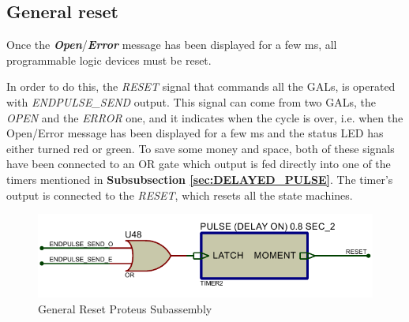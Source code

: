 \subsection{General reset}
\label{sec:GENERAL_RESET}

Once the \textbf{\textit{Open}}/\textbf{\textit{Error}} message has been displayed for a few ms, all programmable logic devices must be reset.
\medskip

In order to do this, the \emph{RESET} signal that commands all the GALs, is operated with \emph{ENDPULSE\_SEND} output. This signal can come from two GALs, the \emph{OPEN} and the \emph{ERROR} one, and it indicates when the cycle is over, i.e. when the Open/Error message has been displayed for a few ms and the status LED has either turned red or green. To save some money and space, both of these signals have been connected to an OR gate which output is fed directly into one of the timers mentioned in \textbf{Subsubsection \ref{sec:DELAYED_PULSE}}. The timer's output is connected to the \emph{RESET}, which resets all the state machines.

\begin{figure}[H]
    \centering
    \includegraphics[scale = 1]{Graphics/GENERAL RESET/GENERAL_RESET.PDF}
    \caption{General Reset Proteus Subassembly}
    \label{fig:GENERAL_RESET}
\end{figure}{}